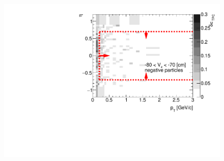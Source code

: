 \begin{figure}[H]
{		\includegraphics[width=\linewidth,page=31]{graphics/systematicsEfficiency/deadMaterial/secondaries_Unbinned_Charged_SD.pdf}\\
	}%
\end{figure}

